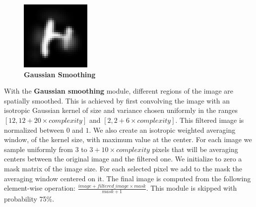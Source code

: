\documentclass{article} %
\begin{document}
\vspace*{1mm}

\begin{figure}
\vspace*{-6mm}
\begin{center}
\includegraphics[scale=.4]{images/Bruitgauss_only.png}\\
{\bf Gaussian Smoothing}
\end{center}
\end{figure}
With the {\bf Gaussian smoothing} module, 
different regions of the image are spatially smoothed.
This is achieved  by first convolving
the image with an isotropic Gaussian kernel of
size and variance chosen uniformly in the ranges $[12,12 + 20 \times
complexity]$ and $[2,2 + 6 \times complexity]$. This filtered image is normalized
between $0$ and $1$.  We also create an isotropic weighted averaging window, of the
kernel size, with maximum value at the center.  For each image we sample
uniformly from $3$ to $3 + 10 \times complexity$ pixels that will be
averaging centers between the original image and the filtered one.  We
initialize to zero a mask matrix of the image size. For each selected pixel
we add to the mask the averaging window centered on it.  The final image is
computed from the following element-wise operation: $\frac{image + filtered\_image
\times mask}{mask+1}$.
This module is skipped with probability 75\%.

\newpage

\vspace*{-9mm}
\end{document}
